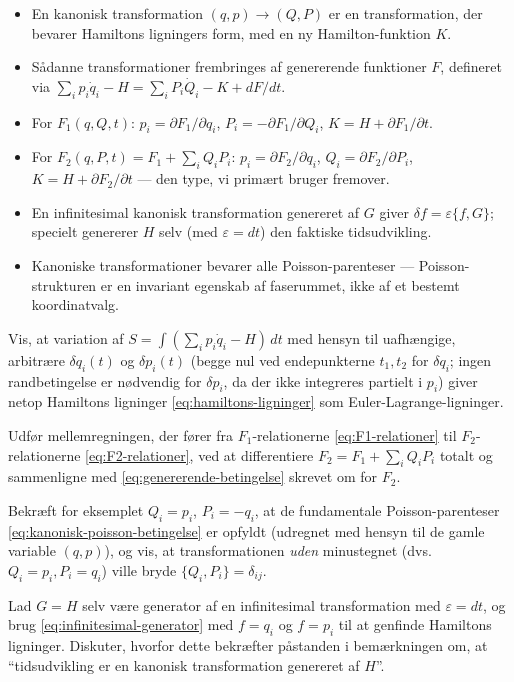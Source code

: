 \begin{itemize}
  \item En kanonisk transformation $(q,p)\to(Q,P)$ er en transformation,
        der bevarer Hamiltons ligningers form, med en ny
        Hamilton-funktion $K$.
  \item Sådanne transformationer frembringes af genererende funktioner
        $F$, defineret via
        $\sum_ip_i\dot q_i-H=\sum_iP_i\dot Q_i-K+dF/dt$.
  \item For $F_1(q,Q,t)$: $p_i=\partial F_1/\partial q_i$,
        $P_i=-\partial F_1/\partial Q_i$, $K=H+\partial F_1/\partial t$.
  \item For $F_2(q,P,t)=F_1+\sum_iQ_iP_i$: $p_i=\partial F_2/\partial q_i$,
        $Q_i=\partial F_2/\partial P_i$, $K=H+\partial F_2/\partial t$
        — den type, vi primært bruger fremover.
  \item En infinitesimal kanonisk transformation genereret af $G$
        giver $\delta f=\varepsilon\{f,G\}$; specielt genererer $H$
        selv (med $\varepsilon=dt$) den faktiske tidsudvikling.
  \item Kanoniske transformationer bevarer alle Poisson-parenteser —
        Poisson-strukturen er en invariant egenskab af faserummet, ikke
        af et bestemt koordinatvalg.
\end{itemize}

\begin{opgave}
Vis, at variation af $S=\int(\sum_ip_i\dot q_i-H)\,dt$ med hensyn til
uafhængige, arbitrære $\delta q_i(t)$ og $\delta p_i(t)$ (begge nul
ved endepunkterne $t_1,t_2$ for $\delta q_i$; ingen randbetingelse er
nødvendig for $\delta p_i$, da der ikke integreres partielt i $p_i$)
giver netop Hamiltons ligninger \eqref{eq:hamiltons-ligninger} som
Euler-Lagrange-ligninger.
\end{opgave}

\begin{opgave}
Udfør mellemregningen, der fører fra $F_1$-relationerne
\eqref{eq:F1-relationer} til $F_2$-relationerne
\eqref{eq:F2-relationer}, ved at differentiere
$F_2=F_1+\sum_iQ_iP_i$ totalt og sammenligne med
\eqref{eq:genererende-betingelse} skrevet om for $F_2$.
\end{opgave}

\begin{opgave}
Bekræft for eksemplet $Q_i=p_i$, $P_i=-q_i$, at de fundamentale
Poisson-parenteser \eqref{eq:kanonisk-poisson-betingelse} er opfyldt
(udregnet med hensyn til de gamle variable $(q,p)$), og vis, at
transformationen \emph{uden} minustegnet (dvs.\ $Q_i=p_i,P_i=q_i$)
ville bryde $\{Q_i,P_i\}=\delta_{ij}$.
\end{opgave}

\begin{opgave}
Lad $G=H$ selv være generator af en infinitesimal transformation med
$\varepsilon=dt$, og brug \eqref{eq:infinitesimal-generator} med
$f=q_i$ og $f=p_i$ til at genfinde Hamiltons ligninger. Diskuter,
hvorfor dette bekræfter påstanden i bemærkningen om, at ``tidsudvikling
er en kanonisk transformation genereret af $H$''.
\end{opgave}
